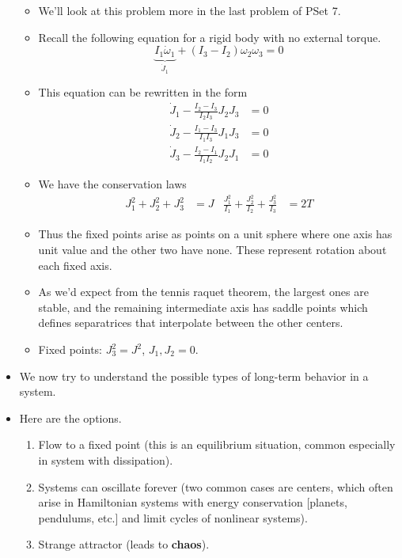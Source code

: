 \documentclass[../notes.tex]{subfiles}
\begin{document}
\begin{itemize}
    \begin{itemize}
        \item We'll look at this problem more in the last problem of PSet 7.
        \item Recall the following equation for a rigid body with no external torque.
        \begin{equation*}
            \underbrace{I_1\dot{\omega}_1}_{\dot{J}_1}+(I_3-I_2)\omega_2\omega_3 = 0
        \end{equation*}
        \item This equation can be rewritten in the form
        \begin{align*}
            \dot{J}_1-\frac{I_2-I_3}{I_2I_3}J_2J_3 &= 0\\
            \dot{J}_2-\frac{I_1-I_3}{I_1I_3}J_1J_3 &= 0\\
            \dot{J}_3-\frac{I_2-I_1}{I_1I_2}J_2J_1 &= 0
        \end{align*}
        \item We have the conservation laws
        \begin{align*}
            J_1^2+J_2^2+J_3^2 &= J&
            \frac{J_1^2}{I_1}+\frac{J_2^2}{I_2}+\frac{J_3^2}{I_3} &= 2T
        \end{align*}
        \item Thus the fixed points arise as points on a unit sphere where one axis has unit value and the other two have none. These represent rotation about each fixed axis.
        \item As we'd expect from the tennis raquet theorem, the largest ones are stable, and the remaining intermediate axis has saddle points which defines separatrices that interpolate between the other centers.
        \item Fixed points: $J_3^2=J^2$, $J_1,J_2=0$.
    \end{itemize}
    \item We now try to understand the possible types of long-term behavior in a system.
    \item Here are the options.
    \begin{enumerate}
        \item Flow to a fixed point (this is an equilibrium situation, common especially in system with dissipation).
        \item Systems can oscillate forever (two common cases are centers, which often arise in Hamiltonian systems with energy conservation [planets, pendulums, etc.] and limit cycles of nonlinear systems).
        \item Strange attractor (leads to \textbf{chaos}).

\end{enumerate}
\end{itemize}
\end{document}
